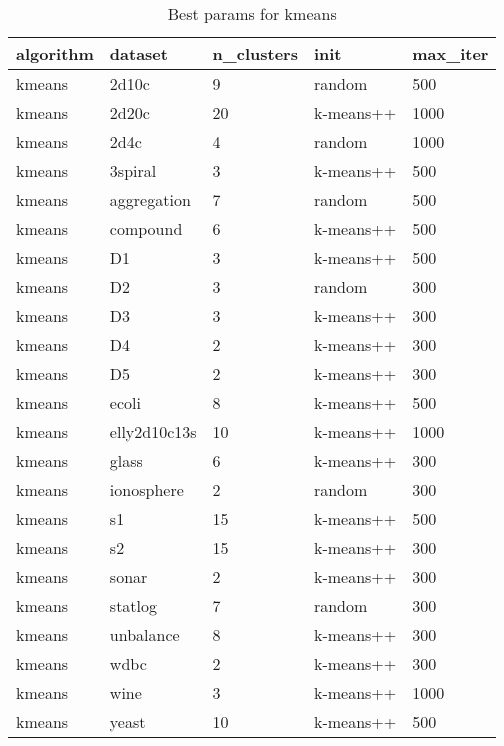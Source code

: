 \begin{table}[H]
\centering
\caption{Best params for kmeans}
\label{tab:params:kmeans}
\begin{tabular}{|l|l|l|l|l|}
\hline
algorithm & dataset & n\_clusters & init & max\_iter \\
\hline
kmeans & 2d10c & 9 & random & 500 \\
\hline
kmeans & 2d20c & 20 & k-means++ & 1000 \\
\hline
kmeans & 2d4c & 4 & random & 1000 \\
\hline
kmeans & 3spiral & 3 & k-means++ & 500 \\
\hline
kmeans & aggregation & 7 & random & 500 \\
\hline
kmeans & compound & 6 & k-means++ & 500 \\
\hline
kmeans & D1 & 3 & k-means++ & 500 \\
\hline
kmeans & D2 & 3 & random & 300 \\
\hline
kmeans & D3 & 3 & k-means++ & 300 \\
\hline
kmeans & D4 & 2 & k-means++ & 300 \\
\hline
kmeans & D5 & 2 & k-means++ & 300 \\
\hline
kmeans & ecoli & 8 & k-means++ & 500 \\
\hline
kmeans & elly2d10c13s & 10 & k-means++ & 1000 \\
\hline
kmeans & glass & 6 & k-means++ & 300 \\
\hline
kmeans & ionosphere & 2 & random & 300 \\
\hline
kmeans & s1 & 15 & k-means++ & 500 \\
\hline
kmeans & s2 & 15 & k-means++ & 300 \\
\hline
kmeans & sonar & 2 & k-means++ & 300 \\
\hline
kmeans & statlog & 7 & random & 300 \\
\hline
kmeans & unbalance & 8 & k-means++ & 300 \\
\hline
kmeans & wdbc & 2 & k-means++ & 300 \\
\hline
kmeans & wine & 3 & k-means++ & 1000 \\
\hline
kmeans & yeast & 10 & k-means++ & 500 \\
\hline
\end{tabular}
\end{table}